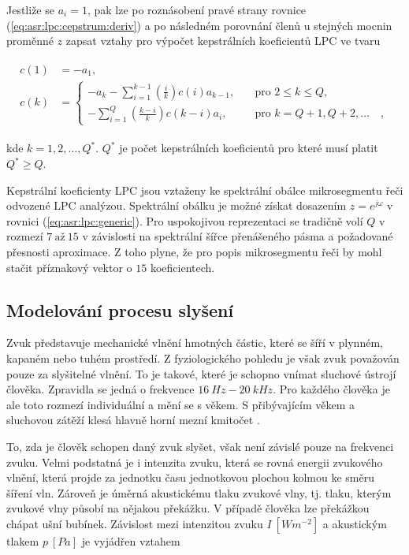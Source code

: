 \noindent Jestliže se $a_i = 1$, pak lze po roznásobení pravé strany rovnice (\ref{eq:asr:lpc:cepstrum:deriv}) a po následném porovnání členů u stejných mocnin proměnné $z$ zapsat vztahy pro výpočet kepstrálních koeficientů LPC ve tvaru

\begin{align}
  \begin{split}
    c(1) &= -a_1, \\
    c(k) &=
    \begin{cases}
      - a_k - \sum_{i=1}^{k-1} \left(\frac{i}{k}\right) c(i) a_{k-1},  & \quad \text{pro } 2 \leq k \leq Q, \\
      - \sum_{i=1}^{Q} \left(\frac{k - i}{k}\right) c(k-i) a_i,  & \quad \text{pro } k = Q + 1, Q + 2, \dots \quad ,
    \end{cases}
  \end{split}
  \label{eq:asr:lpc:cepstrum:coef}
\end{align}

\noindent kde $k = 1, 2, \dots , Q^{*}$. $Q^{*}$ je počet kepstrálních koeficientů pro které musí platit $Q^{*} \geq Q$.

Kepstrální koeficienty LPC jsou vztaženy ke spektrální obálce mikrosegmentu řeči odvozené LPC analýzou. Spektrální obálku je možné získat dosazením $z = e^{j\omega}$ v rovnici (\ref{eq:asr:lpc:generic}). Pro uspokojivou reprezentaci se tradičně volí $Q$ v rozmezí $7\ \text{až}\ 15$ v závislosti na spektrální šířce přenášeného pásma a požadované přesnosti aproximace. Z toho plyne, že pro popis mikrosegmentu řeči by mohl stačit příznakový vektor o $15$ koeficientech.

\subsection{Modelování procesu slyšení}
\label{chap:asr:parametrization:hearing}

Zvuk představuje mechanické vlnění hmotných částic, které se šíří v plynném, kapaném nebo tuhém prostředí. Z fyziologického pohledu je však zvuk považován pouze za slyšitelné vlnění. To je takové, které je schopno vnímat sluchové ústrojí člověka. Zpravidla se jedná o frekvence $16\ Hz - 20\ kHz$. Pro každého člověka je ale toto rozmezí individuální a mění se s věkem. S přibývajícím věkem a sluchovou zátěží klesá hlavně horní mezní kmitočet \cite{Psutka2006}.

To, zda je člověk schopen daný zvuk slyšet, však není závislé pouze na frekvenci zvuku. Velmi podstatná je i intenzita zvuku, která se rovná energii zvukového vlnění, která projde za jednotku času jednotkovou plochou kolmou ke směru šíření vln. Zároveň je úměrná akustickému tlaku zvukové vlny, tj. tlaku, kterým zvukové vlny působí na nějakou překážku. V případě člověka lze překážkou chápat ušní bubínek. Závislost mezi intenzitou zvuku $I\ \left[Wm^{-2}\right]$ a akustickým tlakem $p\ \left[Pa\right]$ je vyjádřen vztahem


